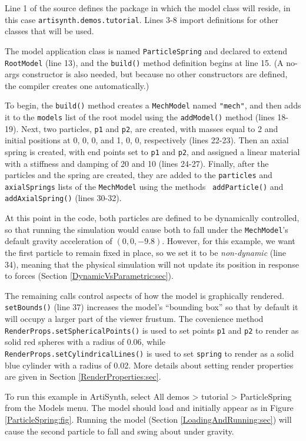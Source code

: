 Line 1 of the source defines the package in which the model class will
reside, in this case {\tt artisynth.demos.tutorial}. Lines 3-8 import
definitions for other classes that will be used.

The model application class is named {\tt ParticleSpring} and declared
to extend {\tt RootModel} (line 13), and the {\tt build()} method
definition begins at line 15. (A no-args constructor is also needed,
but because no other constructors are defined, the compiler creates
one automatically.)

To begin, the {\tt build()} method creates a {\tt MechModel} named
{\tt "mech"}, and then adds it to the {\tt models} list of the root model
using the {\tt addModel()} method (lines 18-19). Next, two particles,
{\tt p1} and {\tt p2}, are created, with masses equal to 2 and initial
positions at 0, 0, 0, and 1, 0, 0, respectively (lines 22-23). Then an
axial spring is created, with end points set to {\tt p1} and {\tt p2},
and assigned a linear material with a stiffness and damping of 20 and
10 (lines 24-27). Finally, after the particles and the spring are
created, they are added to the {\tt particles} and {\tt axialSprings}
lists of the {\tt MechModel} using the methods {\tt
addParticle()} and {\tt addAxialSpring()} (lines 30-32).

At this point in the code, both particles are defined to be
dynamically controlled, so that running the simulation would cause
both to fall under the {\tt MechModel}'s default gravity acceleration
of $(0, 0, -9.8)$. However, for this example, we want the first
particle to remain fixed in place, so we set it to be {\it
non-dynamic} (line 34), meaning that the physical simulation will not
update its position in response to forces (Section
\ref{DynamicVsParametric:sec}).

The remaining calls control aspects of how the model is graphically
rendered.  {\tt setBounds()} (line 37) increases the model's
``bounding box'' so that by default it will occupy a larger part of
the viewer frustum. The covenience method {\tt
RenderProps.setSphericalPoints()} is used to set points {\tt p1} and
{\tt p2} to render as solid red spheres with a radius of 0.06, while
{\tt RenderProps.setCylindricalLines()} is used to set {\tt spring} to
render as a solid blue cylinder with a radius of 0.02. More details
about setting render properties are given in Section
\ref{RenderProperties:sec}.

To run this example in ArtiSynth, select {\sf All demos > tutorial >
ParticleSpring} from the {\sf Models} menu. The model should load and
initially appear as in Figure \ref{ParticleSpring:fig}.  Running
the model (Section \ref{LoadingAndRunning:sec}) will
cause the second particle to fall and swing about under gravity.

